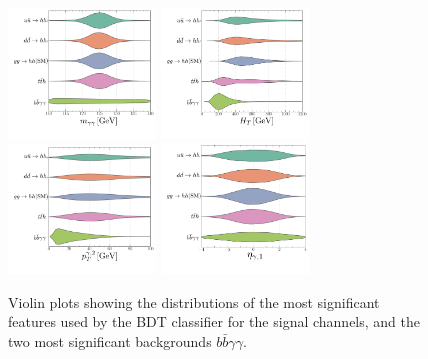 \begin{figure}[htpb!]
	\centering
	\includegraphics[width=0.35\textwidth]{fig/shape-MAA} 	\hspace*{0.25 cm}
	\includegraphics[width=0.35\textwidth]{fig/shape-HT}  \\
	\includegraphics[width=0.35\textwidth]{fig/shape-PTA2} \hspace*{0.25 cm}
	\includegraphics[width=0.35\textwidth]{fig/shape-ETAa1} 
	\caption{Violin plots showing the distributions of the most significant features used by the BDT classifier for the signal channels, and the two most significant backgrounds $ b \bar b \gamma \gamma$. }
	\label{fig:voilen}
\end{figure}  
